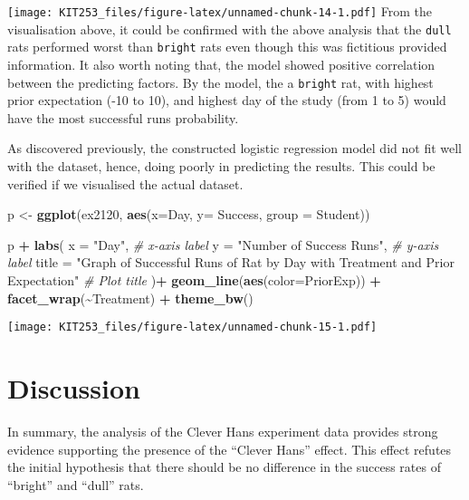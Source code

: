 \documentclass[
]{article}
\newenvironment{Shaded}{\begin{snugshade}}{\end{snugshade}}
\newcommand{\AttributeTok}[1]{\textcolor[rgb]{0.13,0.29,0.53}{#1}}
\newcommand{\CommentTok}[1]{\textcolor[rgb]{0.56,0.35,0.01}{\textit{#1}}}
\newcommand{\FunctionTok}[1]{\textcolor[rgb]{0.13,0.29,0.53}{\textbf{#1}}}
\newcommand{\NormalTok}[1]{#1}
\newcommand{\OtherTok}[1]{\textcolor[rgb]{0.56,0.35,0.01}{#1}}
\newcommand{\SpecialCharTok}[1]{\textcolor[rgb]{0.81,0.36,0.00}{\textbf{#1}}}
\newcommand{\StringTok}[1]{\textcolor[rgb]{0.31,0.60,0.02}{#1}}
\begin{document}
\texttt{[image: KIT253\_files/figure-latex/unnamed-chunk-14-1.pdf]} From
the visualisation above, it could be confirmed with the above analysis
that the \texttt{dull} rats performed worst than \texttt{bright} rats
even though this was fictitious provided information. It also worth
noting that, the model showed positive correlation between the
predicting factors. By the model, the a \texttt{bright} rat, with
highest prior expectation (-10 to 10), and highest day of the study
(from 1 to 5) would have the most successful runs probability.

As discovered previously, the constructed logistic regression model did
not fit well with the dataset, hence, doing poorly in predicting the
results. This could be verified if we visualised the actual dataset.

\begin{Shaded}
\begin{Highlighting}[]
\NormalTok{p }\OtherTok{\textless{}{-}} \FunctionTok{ggplot}\NormalTok{(ex2120, }\FunctionTok{aes}\NormalTok{(}\AttributeTok{x=}\NormalTok{Day, }\AttributeTok{y=}\NormalTok{ Success, }\AttributeTok{group =}\NormalTok{ Student))}

\NormalTok{p }\SpecialCharTok{+} \FunctionTok{labs}\NormalTok{(}
  \AttributeTok{x =} \StringTok{"Day"}\NormalTok{,                   }\CommentTok{\# x{-}axis label}
  \AttributeTok{y =} \StringTok{"Number of Success Runs"}\NormalTok{,    }\CommentTok{\# y{-}axis label}
  \AttributeTok{title =} \StringTok{"Graph of Successful Runs of Rat by Day with Treatment and Prior Expectation"}  \CommentTok{\# Plot title}
\NormalTok{)}\SpecialCharTok{+} \FunctionTok{geom\_line}\NormalTok{(}\FunctionTok{aes}\NormalTok{(}\AttributeTok{color=}\NormalTok{PriorExp)) }\SpecialCharTok{+} \FunctionTok{facet\_wrap}\NormalTok{(}\SpecialCharTok{\textasciitilde{}}\NormalTok{Treatment) }\SpecialCharTok{+} \FunctionTok{theme\_bw}\NormalTok{()}
\end{Highlighting}
\end{Shaded}

\texttt{[image: KIT253\_files/figure-latex/unnamed-chunk-15-1.pdf]}

\hypertarget{discussion}{%
\section{Discussion}\label{discussion}}

In summary, the analysis of the Clever Hans experiment data provides
strong evidence supporting the presence of the ``Clever Hans'' effect.
This effect refutes the initial hypothesis that there should be no
difference in the success rates of ``bright'' and ``dull'' rats.
\end{document}
